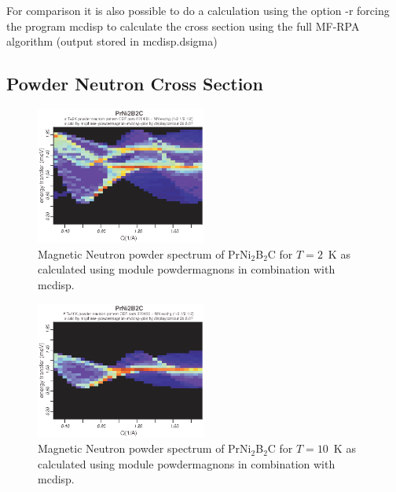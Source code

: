 For comparison it is also possible to do a calculation using the option {\prg -r} forcing
 the program {\prg mcdisp} to calculate the cross section
 using the full MF-RPA algorithm (output stored in {\prg mcdisp.dsigma})

\subsection{Powder Neutron Cross Section}


\begin{figure}[tb]%
\begin{center}\leavevmode
\includegraphics[angle=0, width=0.5\textwidth]{figsrc/contour2K_070504.eps}
\end{center}
\caption{Magnetic Neutron powder spectrum of PrNi$_2$B$_2$C for $T=2$~K as calculated using module {\prg powdermagnons} %
in combination with {\prg 
mcdisp}.}\label{prni2b2c_2K}
\end{figure}

\begin{figure}[tb]%
\begin{center}\leavevmode
\includegraphics[angle=0, width=0.5\textwidth]{figsrc/contour10K_070504.eps}
\end{center}
\caption{Magnetic Neutron powder spectrum of PrNi$_2$B$_2$C for $T=10$~K  as calculated using module {\prg %
powdermagnons} in combination with {\prg 
mcdisp}.}\label{prni2b2c_10K}
\end{figure}

